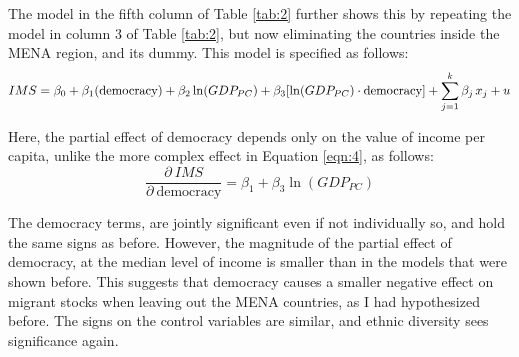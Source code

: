 \documentclass[../main.tex]{subfiles}
\begin{document}
The model in the fifth column of Table \ref{tab:2} further shows this by repeating the model in column 3 of Table \ref{tab:2}, but now eliminating the countries inside the MENA region, and its dummy. This model is specified as follows:
\begin{equation}
    IMS=\beta_0+\beta_1 (\text{democracy}) + \beta_2 \ln (GDP_{PC})+\beta_3[\ln (GDP_{PC}) \cdot \text{democracy}]+\sum_{j=1}^k \beta_j\hspace{0.05cm} x_j+u
    \label{eqn:7}
\end{equation}

Here, the partial effect of democracy depends only on the value of income per capita, unlike the more complex effect in Equation \ref{eqn:4},  as follows: 
\begin{equation}
    \frac{\partial \ IMS}{\partial \ \text{democracy}} = \beta_1+\beta_3 \ln (GDP_{PC})
    \label{eqn:8}
\end{equation}

The democracy terms, are jointly significant even if not individually so, and hold the same signs as before. However, the magnitude of the partial effect of democracy, at the median level of income is smaller than in the models that were shown before. This suggests that democracy causes a smaller negative effect on migrant stocks when leaving out the MENA countries, as I had hypothesized before. The signs on the control variables are similar, and ethnic diversity sees significance again. 
\begin{figure}[H]
\centering
{}
\end{figure}
\end{document}
